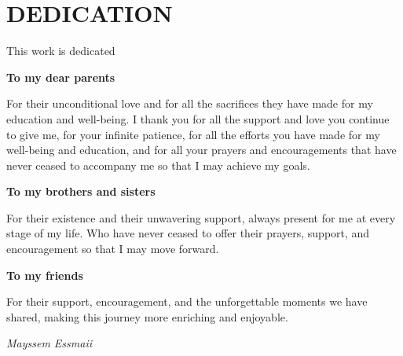 ﻿\titlespacing*{\chapter}{0pt}{-2cm}{30pt}
\chapter*{DEDICATION}
\titlespacing*{\chapter}{0pt}{0pt}{50pt}
\thispagestyle{MyStyle}

\begin{center}
This work is dedicated
\end{center}

\begin{center}
\textbf{\large To my dear parents}
\end{center}
\begin{center}
For their unconditional love and for all the sacrifices they have made for my education and well-being. I thank you for all the support and love you continue to give me, for your infinite patience, for all the efforts you have made for my well-being and education, and for all your prayers and encouragements that have never ceased to accompany me so that I may achieve my goals.
\end{center}

\begin{center}
\textbf{\large To my brothers and sisters}
\end{center}
\begin{center}
For their existence and their unwavering support, always present for me at every stage of my life. Who have never ceased to offer their prayers, support, and encouragement so that I may move forward.
\end{center}

\begin{center}
\textbf{\large To my friends}
\end{center}
\begin{center}
For their support, encouragement, and the unforgettable moments we have shared, making this journey more enriching and enjoyable.
\end{center}

\vspace{1.5cm}

\begin{flushright}
\textit{Mayssem Essmaii}
\end{flushright}
